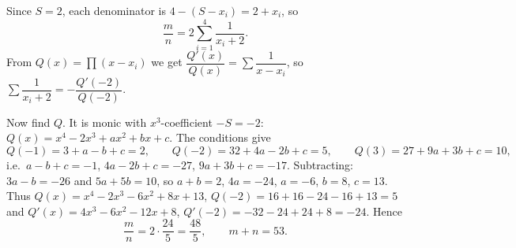 Since $S=2$, each denominator is $4-(S-x_i)=2+x_i$, so
\[
\dfrac {m}{n}=2\sum_{i=1}^4\dfrac{1}{x_i+2}.
\]
From $Q(x)=\prod(x-x_i)$ we get $\dfrac{Q'(x)}{Q(x)}=\sum\dfrac{1}{x-x_i}$, so $\sum\dfrac{1}{x_i+2}=-\dfrac{Q'(-2)}{Q(-2)}$.

Now find $Q$. It is monic with $x^3$-coefficient $-S=-2$: $Q(x)=x^4-2x^3+ax^2+bx+c$. The conditions give
\[
Q(-1)=3+a-b+c=2,\qquad Q(-2)=32+4a-2b+c=5,\qquad Q(3)=27+9a+3b+c=10,
\]
i.e.\ $a-b+c=-1$, $4a-2b+c=-27$, $9a+3b+c=-17$. Subtracting: $3a-b=-26$ and $5a+5b=10$, so $a+b=2$, $4a=-24$, $a=-6$, $b=8$, $c=13$. Thus $Q(x)=x^4-2x^3-6x^2+8x+13$, $Q(-2)=16+16-24-16+13=5$ and $Q'(x)=4x^3-6x^2-12x+8$, $Q'(-2)=-32-24+24+8=-24$. Hence
\[
\dfrac {m}{n}=2\cdot\dfrac{24}{5}=\dfrac{48}{5},\qquad m+n=\boxed{53}.
\]
